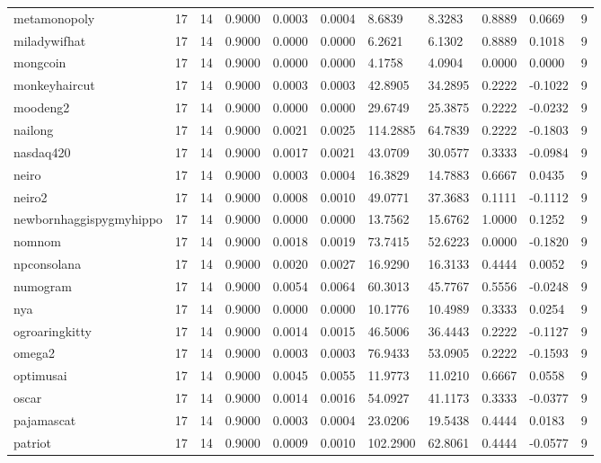 \begin{table}[htbp]
\begin{tabular}{lllllllllll}
metamonopoly & 17 & 14 & 0.9000 & 0.0003 & 0.0004 & 8.6839 & 8.3283 & 0.8889 & 0.0669 & 9 \\
miladywifhat & 17 & 14 & 0.9000 & 0.0000 & 0.0000 & 6.2621 & 6.1302 & 0.8889 & 0.1018 & 9 \\
mongcoin & 17 & 14 & 0.9000 & 0.0000 & 0.0000 & 4.1758 & 4.0904 & 0.0000 & 0.0000 & 9 \\
monkeyhaircut & 17 & 14 & 0.9000 & 0.0003 & 0.0003 & 42.8905 & 34.2895 & 0.2222 & -0.1022 & 9 \\
moodeng2 & 17 & 14 & 0.9000 & 0.0000 & 0.0000 & 29.6749 & 25.3875 & 0.2222 & -0.0232 & 9 \\
nailong & 17 & 14 & 0.9000 & 0.0021 & 0.0025 & 114.2885 & 64.7839 & 0.2222 & -0.1803 & 9 \\
nasdaq420 & 17 & 14 & 0.9000 & 0.0017 & 0.0021 & 43.0709 & 30.0577 & 0.3333 & -0.0984 & 9 \\
neiro & 17 & 14 & 0.9000 & 0.0003 & 0.0004 & 16.3829 & 14.7883 & 0.6667 & 0.0435 & 9 \\
neiro2 & 17 & 14 & 0.9000 & 0.0008 & 0.0010 & 49.0771 & 37.3683 & 0.1111 & -0.1112 & 9 \\
newbornhaggispygmyhippo & 17 & 14 & 0.9000 & 0.0000 & 0.0000 & 13.7562 & 15.6762 & 1.0000 & 0.1252 & 9 \\
nomnom & 17 & 14 & 0.9000 & 0.0018 & 0.0019 & 73.7415 & 52.6223 & 0.0000 & -0.1820 & 9 \\
npconsolana & 17 & 14 & 0.9000 & 0.0020 & 0.0027 & 16.9290 & 16.3133 & 0.4444 & 0.0052 & 9 \\
numogram & 17 & 14 & 0.9000 & 0.0054 & 0.0064 & 60.3013 & 45.7767 & 0.5556 & -0.0248 & 9 \\
nya & 17 & 14 & 0.9000 & 0.0000 & 0.0000 & 10.1776 & 10.4989 & 0.3333 & 0.0254 & 9 \\
ogroaringkitty & 17 & 14 & 0.9000 & 0.0014 & 0.0015 & 46.5006 & 36.4443 & 0.2222 & -0.1127 & 9 \\
omega2 & 17 & 14 & 0.9000 & 0.0003 & 0.0003 & 76.9433 & 53.0905 & 0.2222 & -0.1593 & 9 \\
optimusai & 17 & 14 & 0.9000 & 0.0045 & 0.0055 & 11.9773 & 11.0210 & 0.6667 & 0.0558 & 9 \\
oscar & 17 & 14 & 0.9000 & 0.0014 & 0.0016 & 54.0927 & 41.1173 & 0.3333 & -0.0377 & 9 \\
pajamascat & 17 & 14 & 0.9000 & 0.0003 & 0.0004 & 23.0206 & 19.5438 & 0.4444 & 0.0183 & 9 \\
patriot & 17 & 14 & 0.9000 & 0.0009 & 0.0010 & 102.2900 & 62.8061 & 0.4444 & -0.0577 & 9 \\

\end{tabular}
\end{table}
